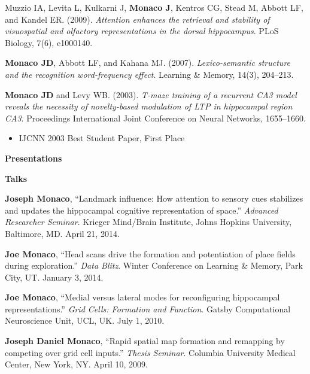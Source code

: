 \documentclass[10pt]{article}
\begin{document}
\begin{description}
\item Muzzio IA, Levita L, Kulkarni J, \textbf{Monaco J}, Kentros CG, Stead M, Abbott LF, and Kandel ER. (2009). \emph{Attention enhances the retrieval and stability of visuospatial and olfactory representations in the dorsal hippocampus}. PLoS Biology, 7(6), e1000140.
\item \textbf{Monaco JD}, Abbott LF, and Kahana MJ. (2007). \emph{Lexico-semantic structure and the recognition word-frequency effect}. Learning \& Memory, 14(3), 204--213. 
\item \textbf{Monaco JD} and Levy WB. (2003). \emph{T-maze training of a recurrent CA3 model reveals the necessity of novelty-based modulation of LTP in hippocampal region CA3}. Proceedings International Joint Conference on Neural Networks, 1655--1660.\nopagebreak
\begin{itemize}
    \item IJCNN 2003 Best Student Paper, First Place
\end{itemize}
\end{description}

{\large \textbf{Presentations}}\nopagebreak

\begin{description}
\item \textbf{Talks}\nopagebreak
\item[\quad] \textbf{Joseph Monaco}, ``Landmark influence: How attention to sensory cues stabilizes and updates the hippocampal cognitive representation of space.'' \emph{Advanced Researcher Seminar}. Krieger Mind/Brain Institute, Johns Hopkins University, Baltimore, MD. April 21, 2014.
\item[\quad] \textbf{Joe Monaco}, ``Head scans drive the formation and potentiation of place fields during exploration.'' \emph{Data Blitz}. Winter Conference on Learning \& Memory, Park City, UT. January 3, 2014.
\item[\quad] \textbf{Joe Monaco}, ``Medial versus lateral modes for reconfiguring hippocampal representations.'' \emph{Grid Cells: Formation and Function}. Gatsby Computational Neuroscience Unit, UCL, UK. July 1, 2010.
\item[\quad] \textbf{Joseph Daniel Monaco}, ``Rapid spatial map formation and remapping by competing over grid cell inputs.'' \emph{Thesis Seminar}. Columbia University Medical Center, New York, NY. April 10, 2009.
\end{description}
\end{document}
